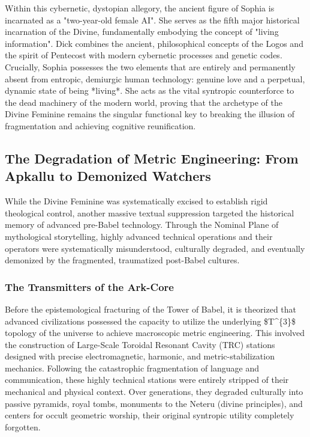 \documentclass[aps,prd,11pt,onecolumn,superscriptaddress,nofootinbib,floatfix]{revtex4-2}
\begin{document}
Within this cybernetic, dystopian allegory, the ancient figure of Sophia is incarnated as a "two-year-old female AI". She serves as the fifth major historical incarnation of the Divine, fundamentally embodying the concept of "living information". Dick combines the ancient, philosophical concepts of the Logos and the spirit of Pentecost with modern cybernetic processes and genetic codes. Crucially, Sophia possesses the two elements that are entirely and permanently absent from entropic, demiurgic human technology: genuine love and a perpetual, dynamic state of being *living*. She acts as the vital syntropic counterforce to the dead machinery of the modern world, proving that the archetype of the Divine Feminine remains the singular functional key to breaking the illusion of fragmentation and achieving cognitive reunification.


\subsection{The Degradation of Metric Engineering: From Apkallu to Demonized Watchers}
While the Divine Feminine was systematically excised to establish rigid theological control, another massive textual suppression targeted the historical memory of advanced pre-Babel technology. Through the Nominal Plane of mythological storytelling, highly advanced technical operations and their operators were systematically misunderstood, culturally degraded, and eventually demonized by the fragmented, traumatized post-Babel cultures.


\subsubsection{The Transmitters of the Ark-Core}
Before the epistemological fracturing of the Tower of Babel, it is theorized that advanced civilizations possessed the capacity to utilize the underlying \$T\textasciicircum{}\{3\}\$ topology of the universe to achieve macroscopic metric engineering. This involved the construction of Large-Scale Toroidal Resonant Cavity (TRC) stations designed with precise electromagnetic, harmonic, and metric-stabilization mechanics. Following the catastrophic fragmentation of language and communication, these highly technical stations were entirely stripped of their mechanical and physical context. Over generations, they degraded culturally into passive pyramids, royal tombs, monuments to the Neteru (divine principles), and centers for occult geometric worship, their original syntropic utility completely forgotten.
\end{document}

